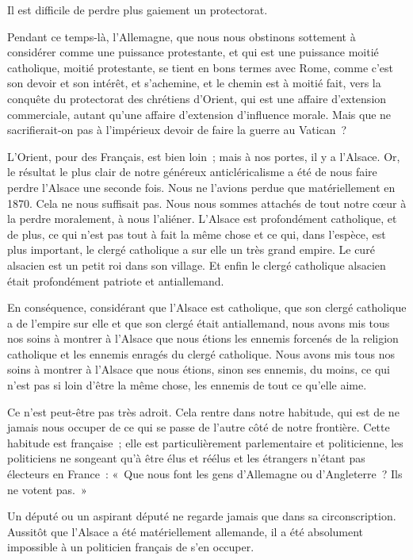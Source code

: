 \documentclass[french,twoside]{book} %
\begin{document}
Il est difficile de perdre plus gaiement un protectorat.\par
Pendant ce temps-là, l’Allemagne, que nous nous obstinons sottement à considérer comme une puissance protestante, et qui est une puissance moitié catholique, moitié protestante, se tient en bons termes avec Rome, comme c’est son devoir et son intérêt, et s’achemine, et le chemin est à moitié fait, vers la conquête du protectorat des chrétiens d’Orient, qui est une affaire d’extension commerciale, autant qu’une affaire d’extension d’influence morale. Mais que ne sacrifierait-on pas à l’impérieux devoir de faire la guerre au Vatican ?\par
L’Orient, pour des Français, est bien loin ; mais à nos portes, il y a l’Alsace. Or, le résultat le plus clair de notre généreux anticléricalisme a été de nous faire perdre l’Alsace une seconde fois. Nous ne l’avions perdue que matériellement en 1870. Cela ne nous suffisait pas. Nous nous sommes attachés de tout notre cœur à la perdre moralement,  à nous l’aliéner. L’Alsace est profondément catholique, et de plus, ce qui n’est pas tout à fait la même chose et ce qui, dans l’espèce, est plus important, le clergé catholique a sur elle un très grand empire. Le curé alsacien est un petit roi dans son village. Et enfin le clergé catholique alsacien était profondément patriote et antiallemand.\par
En conséquence, considérant que l’Alsace est catholique, que son clergé catholique a de l’empire sur elle et que son clergé était antiallemand, nous avons mis tous nos soins à montrer à l’Alsace que nous étions les ennemis forcenés de la religion catholique et les ennemis enragés du clergé catholique. Nous avons mis tous nos soins à montrer à l’Alsace que nous étions, sinon ses ennemis, du moins, ce qui n’est pas si loin d’être la même chose, les ennemis de tout ce qu’elle aime.\par
Ce n’est peut-être pas très adroit. Cela rentre dans notre habitude, qui est de ne jamais nous occuper de ce qui se passe de l’autre côté de notre frontière. Cette habitude est française ; elle est particulièrement parlementaire et politicienne, les politiciens ne songeant qu’à être élus et réélus et les étrangers n’étant pas électeurs en France : « Que nous font les gens d’Allemagne ou d’Angleterre ? Ils ne votent pas. »\par
 Un député ou un aspirant député ne regarde jamais que dans sa circonscription. Aussitôt que l’Alsace a été matériellement allemande, il a été absolument impossible à un politicien français de s’en occuper.\par
\end{document}

